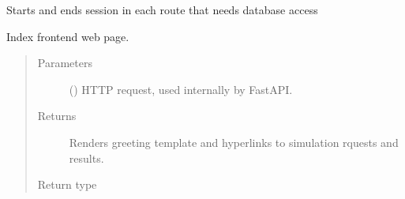 \documentclass[a4paper,landscape,10pt,english]{sphinxmanual}
\begin{document}

\begin{fulllineitems}
\label{\detokenize{code_docs/simulation_API.controller:simulation_API.controller.main.get_db}}
Starts and ends session in each route that needs database access

\end{fulllineitems}


\begin{fulllineitems}
\label{\detokenize{code_docs/simulation_API.controller:simulation_API.controller.main.index}}
Index frontend web page.
\begin{quote}\begin{description}
\item[{Parameters}] \leavevmode
{} () \textendash{} HTTP request, used internally by FastAPI.

\item[{Returns}] \leavevmode
Renders greeting template and hyperlinks to simulation rquests and
results.

\item[{Return type}] \leavevmode
{}

\end{description}\end{quote}

\end{fulllineitems}

\end{document}
